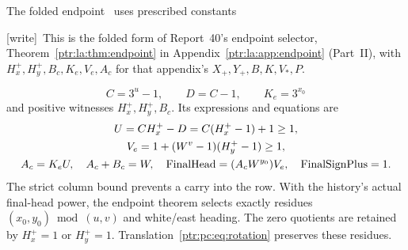 \documentclass[11pt,letterpaper]{article}
\theoremstyle{definition}\newtheorem{definition}[theorem]{Definition}
\theoremstyle{remark}\newtheorem{remark}[theorem]{Remark}
\newcommand{\FS}{\mathrm{FinalSignPlus}}
\newcommand{\wtag}{\textup{[write]}}
\begin{document}
The folded endpoint~\cite{ptr:pc:endpoint} uses prescribed constants

{\small\wtag\ This is the folded form of Report~40's endpoint selector,
Theorem~\ref{ptr:la:thm:endpoint} in Appendix~\ref{ptr:la:app:endpoint}
(Part~II), with $H_x^+,H_y^+,B_c,K_e,V_e,A_c$ for that appendix's
$X_+,Y_+,B,K,V_*,P$.\par}
\[
 C=3^u-1,\qquad D=C-1,\qquad K_e=3^{x_0}
\]
and positive witnesses $H_x^+,H_y^+,B_c$. Its expressions and equations are
\begin{gather}
 U=CH_x^+-D=C(H_x^+-1)+1\ge1,\notag\\
 V_e=1+(W^v-1)(H_y^+-1)\ge1,\label{ptr:pc:eq:positive-end}\\
 A_c=K_eU,\quad A_c+B_c=W,\quad
 \FH=(A_cW^{y_0})V_e,\quad\FS=1.\label{ptr:pc:eq:end}
\end{gather}
The strict column bound prevents a carry into the row. With the history's actual final-head power, the endpoint theorem selects exactly residues $(x_0,y_0)\bmod(u,v)$ and white/east heading. The zero quotients are retained by $H_x^+=1$ or $H_y^+=1$. Translation~\eqref{ptr:pc:eq:rotation} preserves these residues.
\end{document}

